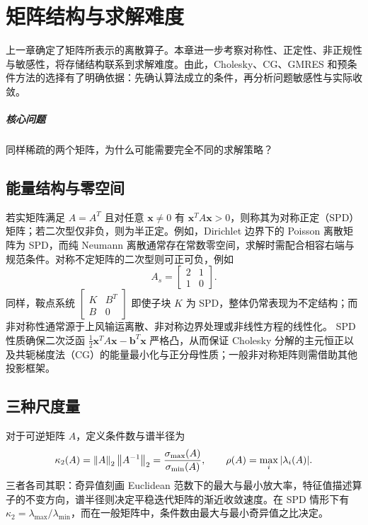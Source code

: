 \chapter{矩阵结构与求解难度}\label{v0ch:2}
\begin{chaptersummary}
上一章确定了矩阵所表示的离散算子。本章进一步考察对称性、正定性、非正规性与敏感性，将存储结构联系到求解难度。由此，Cholesky、CG、GMRES 和预条件方法的选择有了明确依据：先确认算法成立的条件，再分析问题敏感性与实际收敛。
\end{chaptersummary}
\paragraph{核心问题}同样稀疏的两个矩阵，为什么可能需要完全不同的求解策略？

\section{能量结构与零空间}
若实矩阵满足 $A=A^T$ 且对任意 $\bm x\ne0$ 有 $\bm x^TA\bm x>0$，则称其为对称正定（SPD）矩阵；若二次型仅非负，则为半正定。例如，Dirichlet 边界下的 Poisson 离散矩阵为 SPD，而纯 Neumann 离散通常存在常数零空间，求解时需配合相容右端与规范条件。对称不定矩阵的二次型则可正可负，例如
\[
 A_s=\begin{bmatrix}2&1\\1&0\end{bmatrix}.
\]
同样，鞍点系统 $\left[\begin{smallmatrix}K&B^T\\B&0\end{smallmatrix}\right]$ 即使子块 $K$ 为 SPD，整体仍常表现为不定结构；而非对称性通常源于上风输运离散、非对称边界处理或非线性方程的线性化。
SPD 性质确保二次泛函 $\frac12\bm x^TA\bm x-\bm b^T\bm x$ 严格凸，从而保证 Cholesky 分解的主元恒正以及共轭梯度法（CG）的能量最小化与正分母性质；一般非对称矩阵则需借助其他投影框架。
\section{三种尺度量}
对于可逆矩阵 $A$，定义条件数与谱半径为
\[
 \kappa_2(A)=\left\lVert A\right\rVert_2\left\lVert A^{-1}\right\rVert_2
 =\frac{\sigma_{\max}(A)}{\sigma_{\min}(A)},\qquad
 \rho(A)=\max_i|\lambda_i(A)|.
\]
三者各司其职：奇异值刻画 Euclidean 范数下的最大与最小放大率，特征值描述算子的不变方向，谱半径则决定平稳迭代矩阵的渐近收敛速度。在 SPD 情形下有 $\kappa_2=\lambda_{\max}/\lambda_{\min}$，而在一般矩阵中，条件数由最大与最小奇异值之比决定。
